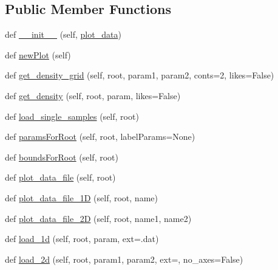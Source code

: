\subsection*{Public Member Functions}
\begin{DoxyCompactItemize}
\item 
def \mbox{\hyperlink{classgetdist_1_1plots_1_1SampleAnalysisGetDist_a9cc760a75796bb3250ee75c4d5d3cfd2}{\+\_\+\+\_\+init\+\_\+\+\_\+}} (self, \mbox{\hyperlink{classgetdist_1_1plots_1_1SampleAnalysisGetDist_a3ab4d1fcd749ff45996919a28ff26929}{plot\+\_\+data}})
\item 
def \mbox{\hyperlink{classgetdist_1_1plots_1_1SampleAnalysisGetDist_a216dc4169528317eabebecce1fa974a4}{new\+Plot}} (self)
\item 
def \mbox{\hyperlink{classgetdist_1_1plots_1_1SampleAnalysisGetDist_a0dd526731ad07af55ecee518231c7a28}{get\+\_\+density\+\_\+grid}} (self, root, param1, param2, conts=2, likes=False)
\item 
def \mbox{\hyperlink{classgetdist_1_1plots_1_1SampleAnalysisGetDist_a0d7a9bedcc6b45701298597a18ce3d9e}{get\+\_\+density}} (self, root, param, likes=False)
\item 
def \mbox{\hyperlink{classgetdist_1_1plots_1_1SampleAnalysisGetDist_a4ff28c8ef05818d493ca2242a320cb43}{load\+\_\+single\+\_\+samples}} (self, root)
\item 
def \mbox{\hyperlink{classgetdist_1_1plots_1_1SampleAnalysisGetDist_ab202e900c09abf868d57584be3cab79a}{params\+For\+Root}} (self, root, label\+Params=None)
\item 
def \mbox{\hyperlink{classgetdist_1_1plots_1_1SampleAnalysisGetDist_a34f3bd56dc36332ccb2b2274a628143a}{bounds\+For\+Root}} (self, root)
\item 
def \mbox{\hyperlink{classgetdist_1_1plots_1_1SampleAnalysisGetDist_a286b765eded460a2bdd3327526c0d1e1}{plot\+\_\+data\+\_\+file}} (self, root)
\item 
def \mbox{\hyperlink{classgetdist_1_1plots_1_1SampleAnalysisGetDist_ad510e8bf6d05a25a2da3f5770e5c530f}{plot\+\_\+data\+\_\+file\+\_\+1D}} (self, root, name)
\item 
def \mbox{\hyperlink{classgetdist_1_1plots_1_1SampleAnalysisGetDist_abca4dbc19b7d18f4b4bc421e38a9a6d3}{plot\+\_\+data\+\_\+file\+\_\+2D}} (self, root, name1, name2)
\item 
def \mbox{\hyperlink{classgetdist_1_1plots_1_1SampleAnalysisGetDist_af7814cfa5b531528542279c3d50473c7}{load\+\_\+1d}} (self, root, param, ext=\textquotesingle{}.dat\textquotesingle{})
\item 
def \mbox{\hyperlink{classgetdist_1_1plots_1_1SampleAnalysisGetDist_a5c17cd9e2e043ccaaced32d01f4f42f8}{load\+\_\+2d}} (self, root, param1, param2, ext=\textquotesingle{}\textquotesingle{}, no\+\_\+axes=False)
\end{DoxyCompactItemize}
